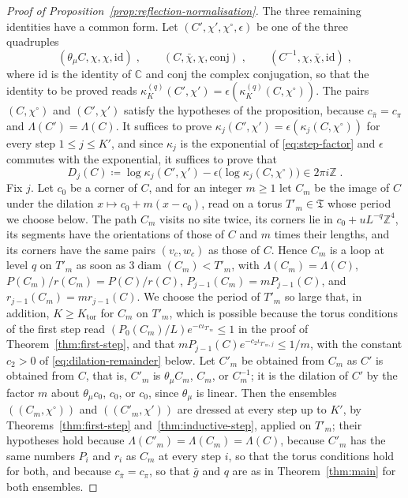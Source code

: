 \documentclass[11pt]{preprint}
\newcommand{\diam}{\operatorname{diam}}
\numberwithin{equation}{section}
\theoremstyle{definition}
\theoremstyle{remark}
\theoremstyle{plain}
\begin{document}
\begin{proof}[Proof of Proposition~\ref{prop:reflection-normalisation}]
The three remaining identities have a common form. Let $(C', \chi', \chi^\circ, \epsilon)$ be one of the three quadruples
\begin{equation}\label{eq:symmetry-cases}
    (\theta_\mu C, \chi, \chi, \mathrm{id})\;,
    \qquad
    (C, \bar\chi, \chi, \mathrm{conj})\;,
    \qquad
    (C^{-1}, \chi, \bar\chi, \mathrm{id})\;,
\end{equation}
where $\mathrm{id}$ is the identity of $\mathbb C$ and $\mathrm{conj}$ the complex conjugation, so that the identity to be proved reads $\kappa^{(q)}_K(C', \chi') = \epsilon(\kappa^{(q)}_K(C, \chi^\circ))$. The pairs $(C, \chi^\circ)$ and $(C', \chi')$ satisfy the hypotheses of the proposition, because $c_{\bar\pi} = c_\pi$ and $\Lambda(C') = \Lambda(C)$. It suffices to prove $\kappa_j(C', \chi') = \epsilon(\kappa_j(C, \chi^\circ))$ for every step $1 \leq j \leq K'$, and since $\kappa_j$ is the exponential of \eqref{eq:step-factor} and $\epsilon$ commutes with the exponential, it suffices to prove that
\begin{equation}\label{eq:log-defect}
    D_j(C) \coloneqq \log\kappa_j(C', \chi') - \epsilon\bigl(\log\kappa_j(C, \chi^\circ)\bigr) \in 2\pi i\mathbb Z\;.
\end{equation}
Fix $j$. Let $c_0$ be a corner of $C$, and for an integer $m \geq 1$ let $C_m$ be the image of $C$ under the dilation $x \mapsto c_0 + m(x - c_0)$, read on a torus $T'_m \in \mathfrak T$ whose period we choose below. The path $C_m$ visits no site twice, its corners lie in $c_0 + uL^{-q}\mathbb Z^4$, its segments have the orientations of those of $C$ and $m$ times their lengths, and its corners have the same pairs $(v_c, w_c)$ as those of $C$. Hence $C_m$ is a loop at level $q$ on $T'_m$ as soon as $3\diam(C_m) < T'_m$, with $\Lambda(C_m) = \Lambda(C)$, $P(C_m)/r(C_m) = P(C)/r(C)$, $P_{j-1}(C_m) = mP_{j-1}(C)$, and $r_{j-1}(C_m) = mr_{j-1}(C)$. We choose the period of $T'_m$ so large that, in addition, $K \geq K_{\mathrm{tor}}$ for $C_m$ on $T'_m$, which is possible because the torus conditions of the first step read $(P_0(C_m)/L)e^{-c\iota_{T'_m}} \leq 1$ in the proof of Theorem~\ref{thm:first-step}, and that $mP_{j-1}(C)e^{-c_2\iota_{T'_m,j}} \leq 1/m$, with the constant $c_2 > 0$ of \eqref{eq:dilation-remainder} below. Let $C'_m$ be obtained from $C_m$ as $C'$ is obtained from $C$, that is, $C'_m$ is $\theta_\mu C_m$, $C_m$, or $C_m^{-1}$; it is the dilation of $C'$ by the factor $m$ about $\theta_\mu c_0$, $c_0$, or $c_0$, since $\theta_\mu$ is linear. Then the ensembles $((C_m, \chi^\circ))$ and $((C'_m, \chi'))$ are dressed at every step up to $K'$, by Theorems~\ref{thm:first-step} and~\ref{thm:inductive-step}, applied on $T'_m$; their hypotheses hold because $\Lambda(C'_m) = \Lambda(C_m) = \Lambda(C)$, because $C'_m$ has the same numbers $P_i$ and $r_i$ as $C_m$ at every step $i$, so that the torus conditions hold for both, and because $c_{\bar\pi} = c_\pi$, so that $\bar g$ and $q$ are as in Theorem~\ref{thm:main} for both ensembles.


\end{proof}
\end{document}
